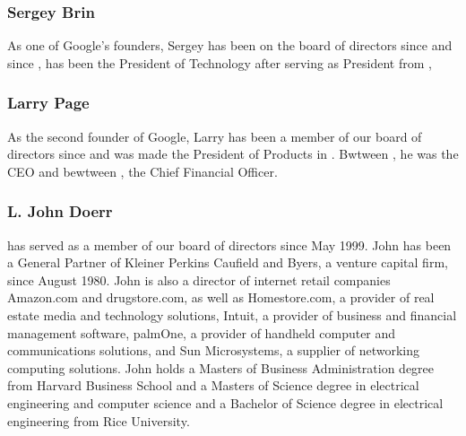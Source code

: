 \documentclass[a4paper,12pt]{article}
\begin{document}
\subsubsection{Sergey Brin}

As one of Google's founders, Sergey has been on the board of directors 
since \cite[September 1998]{board} and since \cite[July 2001]{board},
has been the President of Technology after serving as President from 
\cite[September 1998 to July 2001]{board}, \cite[Sergey holds a Masters 
degree in computer science from Stanford University, a Bachelor of 
Science degree with high honors in mathematics and computer science 
from the University of Maryland at College Park and is currently on 
leave from the Ph.D. program in computer science at Stanford 
University.]{board}

\subsubsection{Larry Page}

As the second founder of Google, Larry has been a member of our board of
directors since \cite[September 1998]{board} and was made the President of
Products in \cite[July 2001]{board}. Bwtween \cite[September 1998 to 
July 2001]{board}, he was the CEO and bewtween \cite[September 1998 to 
July 2002]{board}, the Chief Financial Officer. \cite[Larry holds a 
Masters degree in computer science from Stanford University, a Bachelor 
of Science degree with high honors in engineering, with a concentration 
in computer engineering, from the University of Michigan and is 
currently on leave from the Ph.D. program in computer science at 
Stanford University.]{board}

\subsubsection{L. John Doerr} 

has served as a member of our board of directors since May
1999. John has been a General Partner of Kleiner Perkins Caufield and
Byers, a venture capital firm, since August 1980. John is also a
director of internet retail companies Amazon.com and drugstore.com, as
well as Homestore.com, a provider of real estate media and technology
solutions, Intuit, a provider of business and financial management
software, palmOne, a provider of handheld computer and communications
solutions, and Sun Microsystems, a supplier of networking computing
solutions. John holds a Masters of Business Administration degree from
Harvard Business School and a Masters of Science degree in electrical
engineering and computer science and a Bachelor of Science degree in
electrical engineering from Rice University.
\end{document}
